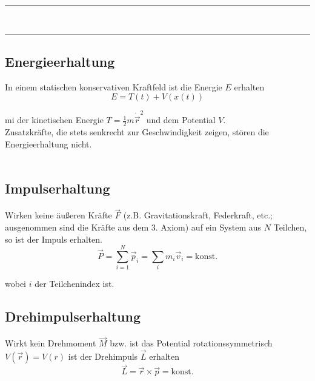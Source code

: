 \documentclass{article}
\begin{document}
\vspace{0.5cm}

{\color{violet}
\hrule
	\\



\hrule
}


\newpage


\subsection{Energieerhaltung}
In einem statischen konservativen Kraftfeld ist die Energie $E$ erhalten
	\begin{equation}
		E = T(t) + V(x(t))
	\end{equation}

mi der kinetischen Energie $T = \frac{1}{2}m\dot{\vec{r}}^2$ und dem Potential $V$.\\
\textcolor{gruen}{Zusatzkräfte, die stets senkrecht zur Geschwindigkeit zeigen, stören die Energieerhaltung nicht.}\\
\\



\subsection{Impulserhaltung}
Wirken keine äußeren Kräfte $\vec{F}$ \textcolor{gruen}{(z.B. Gravitationskraft, Federkraft, etc.; ausgenommen sind die Kräfte aus dem 3. Axiom)} auf ein System aus $N$ Teilchen, so ist der Impuls erhalten.
	\begin{equation}
		\vec{P} = \sum_{i=1}^N \vec{p}_i = \sum_i m_i \vec{v}_i = \text{konst.}
	\end{equation}

wobei $i$ der Teilchenindex ist.


\subsection{Drehimpulserhaltung}
Wirkt kein Drehmoment $\vec{M}$ bzw. ist das Potential rotationssymmetrisch $V(\vec{r}) = V(r)$ ist der Drehimpuls $\vec{L}$ erhalten
	\begin{equation}
		\vec{L} = \vec{r} \times \vec{p} = \text{konst.}
	\end{equation}
\end{document}
